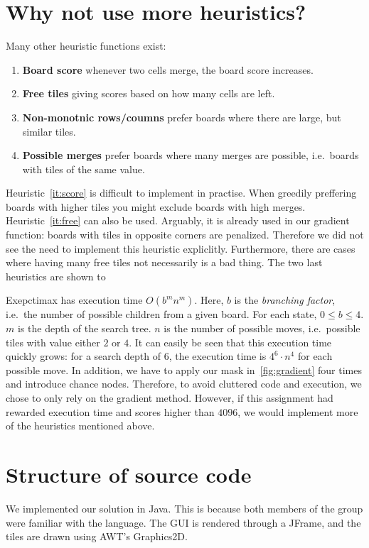 \documentclass[journal]{IEEEtran}
\begin{document}
\section*{Why not use more heuristics?}

Many other heuristic functions exist:
\begin{enumerate}
    \item\label{it:score} \textbf{Board score} \textendash{} whenever two cells merge, the board score increases.
    \item\label{it:free} \textbf{Free tiles} \textendash{} giving scores based on how many cells are left.
    \item\label{it:nonmono} \textbf{Non-monotnic rows/coumns} \textendash{} prefer boards where there are large, but similar
        tiles.
    \item\label{it:merges} \textbf{Possible merges} \textendash{} prefer boards where many merges are possible,
       i.e.\ boards with tiles of the same value.
\end{enumerate}

Heuristic~\ref{it:score} is difficult to implement in practise. When greedily preffering
boards with higher tiles you might exclude boards with high merges.
Heuristic~\ref{it:free} can also be used. Arguably, it is already used in our gradient
function: boards with tiles in opposite corners are penalized. Therefore we did
not see the need to implement this heuristic expliclitly. Furthermore, there are
cases where having many free tiles not necessarily is a bad thing.
The two last heuristics are shown to

Exepctimax has execution time $O(b^{m}n^{m})$. Here, $b$ is the \textit{branching factor},
i.e.\ the number of possible children from a given board. For each state, $0
\leq b \leq 4$.  $m$ is the depth of the search tree. $n$ is the number of possible
moves, i.e.\ possible tiles with value either $2$ or $4$. It can easily be seen
that this execution time quickly grows: for a search depth of 6, the execution
time is $4^{6}\cdot{n^{4}}$ for each possible move. In addition, we have to apply our mask
in~\autoref{fig:gradient} four times and introduce chance nodes. Therefore, to
avoid cluttered code and execution, we chose to only rely on the gradient
method. However, if this assignment had rewarded execution time and scores
higher than $4096$, we would implement more of the heuristics mentioned above.

\section*{Structure of source code}
We implemented our solution in Java. This is because both members of the group
were familiar with the language. The GUI is rendered through a JFrame, and the tiles are
drawn using AWT's Graphics2D.
\end{document}
